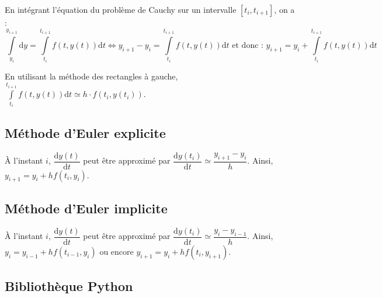 \documentclass[10pt,fleqn]{article} %
\begin{document}
\begin{resultat}
En intégrant l'équation du problème de Cauchy sur un intervalle $[t_i, t_{i+1}]$, on a : 
$$
\int\limits_{y_i}^{y_{i+1}} \text{d}y = \int\limits_{t_i}^{t_{i+1}} f(t,y(t)) \text{d}t 
\Longleftrightarrow 
y_{i+1} - y_i = \int\limits_{t_i}^{t_{i+1}} f(t,y(t)) \text{d}t  \text{ et donc : }  y_{i+1}= y_i + \int\limits_{t_i}^{t_{i+1}} f(t,y(t)) \text{d}t 
$$

 En utilisant la méthode des rectangles à gauche, $\int\limits_{t_i}^{t_{i+1}} f(t,y(t)) \text{d}t  \simeq h \cdot f(t_i,y(t_i)) $.

\end{resultat}


\subsection*{Méthode d'Euler explicite}

À l'instant $i$, $\dfrac{\text{d}y(t)}{\text{d}t}$ peut être approximé par 
$\dfrac{\text{d}y(t_i)}{\text{d}t} \simeq \dfrac{y_{i+1}-y_i}{h}$.
Ainsi, $y_{i+1} = y_i +h  f(t_i,y_i)$.

\subsection*{Méthode d'Euler implicite}
À l'instant $i$, $\dfrac{\text{d}y(t)}{\text{d}t}$ peut être approximé par 
$\dfrac{\text{d}y(t_{i})}{\text{d}t} \simeq \dfrac{y_{i}-y_{i-1}}{h}$.
Ainsi, $y_{i} = y_{i-1} +h  f(t_{i-1},y_{i})$ ou encore $y_{i+1} = y_{i} +h  f(t_{i},y_{i+1})$.
\subsection*{Bibliothèque Python}

\newpage
\end{document}
